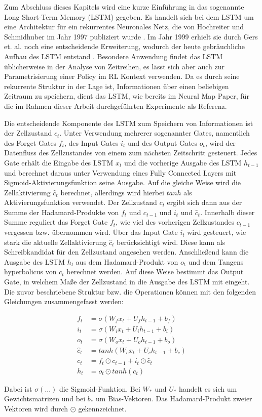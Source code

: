 Zum Abschluss dieses Kapitels wird eine kurze Einführung in das sogenannte Long Short-Term Memory (LSTM) gegeben. Es handelt sich bei dem LSTM um eine Architektur für ein rekurrentes Neuronales Netz, die von Hochreiter und Schmidhuber im Jahr 1997 publiziert wurde \cite{LSTM}. Im Jahr 1999 erhielt sie durch Gers et. al. noch eine entscheidende Erweiterung, wodurch der heute gebräuchliche Aufbau des LSTM entstand \cite{ForgetGate}. Besondere Anwendung findet das LSTM üblicherweise in der Analyse von Zeitreihen, es lässt sich aber auch zur Parametrisierung einer Policy im RL Kontext verwenden. Da es durch seine rekurrente Struktur in der Lage ist, Informationen über einen beliebigen Zeitraum zu speichern, dient das LSTM, wie bereits im Neural Map Paper, für die im Rahmen dieser Arbeit durchgeführten Experimente als Referenz.

Die entscheidende Komponente des LSTM zum Speichern von Informationen ist der Zellzustand $c_t$. Unter Verwendung mehrerer sogenannter Gates, namentlich des Forget Gates $f_t$, des Input Gates $i_t$ und des Output Gates $o_t$, wird der Datenfluss des Zellzustandes von einem zum nächsten Zeitschritt gesteuert. Jedes Gate erhält die Eingabe des LSTM $x_t$ und die vorherige Ausgabe des LSTM $h_{t-1}$ und berechnet daraus unter Verwendung eines Fully Connected Layers mit Sigmoid-Aktivierungsfunktion seine Ausgabe. Auf die gleiche Weise wird die Zellaktivierung $\hat{c}_t$ berechnet, allerdings wird hierbei $tanh$ als Aktivierungsfunktion verwendet. Der Zellzustand $c_t$ ergibt sich dann aus der Summe der Hadamard-Produkte von $f_t$ und $c_{t-1}$ und  $i_t$ und $\hat{c}_t$. Innerhalb dieser Summe reguliert das Forget Gate $f_t$, wie viel des vorherigen Zellzustandes $c_{t-1}$ vergessen bzw. übernommen wird. Über das Input Gate $i_t$ wird gesteuert, wie stark die aktuelle Zellaktivierung $\hat{c}_t$ berücksichtigt wird. Diese kann als Schreibkandidat für den Zellzustand angesehen werden. Anschließend kann die Ausgabe des LSTM $h_t$ aus dem Hadamard-Produkt von $o_t$ und dem Tangens hyperbolicus von $c_t$ berechnet werden. Auf diese Weise bestimmt das Output Gate, in welchem Maße der Zellzustand in die Ausgabe des LSTM mit eingeht. Die zuvor beschriebene Struktur bzw. die Operationen können mit den folgenden Gleichungen zusammengefasst werden:

\begin{equation*}
\begin{align*}
	f_t &= \sigma(W_f x_t + U_f h_{t-1} + b_f) \\
	i_t &= \sigma(W_i x_t + U_i h_{t-1} + b_i) \\
	o_t &= \sigma(W_o x_t + U_o h_{t-1} + b_o) \\
	\hat{c}_t &= tanh(W_c x_t + U_c h_{t-1} + b_c) \\
	c_t &= f_t \odot c_{t-1} + i_t \odot \hat{c}_t \\
	h_t &= o_t \odot tanh(c_t)
\end{align*}
\end{equation*}

Dabei ist $\sigma(\dots)$ die Sigmoid-Funktion. Bei $W_*$ und $U_*$ handelt es sich um Gewichtsmatrizen und bei $b_*$ um Bias-Vektoren. Das Hadamard-Produkt zweier Vektoren wird durch $\odot$ gekennzeichnet.
